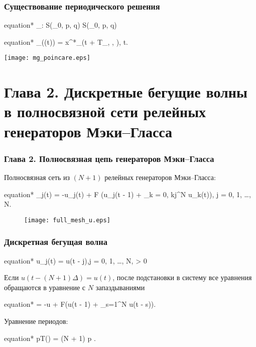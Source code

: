 \begin{frame}
	\frametitle{Существование периодического решения}
	
	\begin{empheq}[box=\myeq]{equation*}
		\Pi_{\gamma}: S(\sigma_0, p, q) \to S(\sigma_0, p, q)
	\end{empheq}
	\begin{empheq}[box=\myeq]{equation*}
		\Pi_{\gamma}(\varphi(t)) = x^*_{\gamma}(t + T_{\gamma, \varphi}, \varphi), \quad t.
	\end{empheq}
	
	\begin{center}
		\texttt{[image: mg\_poincare.eps]}
	\end{center}
\end{frame}

\section{Глава 2. Дискретные бегущие волны в полносвязной сети релейных генераторов Мэки--Гласса}


\begin{frame}
	\frametitle{Глава 2. Полносвязная цепь генераторов Мэки--Гласса}
	
	Полносвязная сеть из $(N + 1)$ релейных генераторов Мэки--Гласса:
	
	\begin{empheq}[box=\myeq]{equation*}
		_j(t) = -\beta u_j(t) + \alpha F \bigg(u_j(t - 1) + \sum\limits_{k = 0, k\neq j}^N u_k(t)\bigg), \quad j = 0, 1, \dots, N.
	\end{empheq}
	
	\begin{figure}
		\centering
		\texttt{[image: full\_mesh\_u.eps]}
	\end{figure}
\end{frame}


\begin{frame}
	\frametitle{Дискретная бегущая волна}
	
	\begin{empheq}[box=\myeq]{equation*}
		u_j(t) = u(t - j\Delta),\quad j = 0, 1, \ldots, N,  \Delta > 0 
	\end{empheq}
	
	Если $u\left(t - (N + 1)\Delta\right) = u(t)$, после подстановки в систему все уравнения обращаются в уравнение с $N$ запаздываниями
	
	\begin{empheq}[box=\myeq]{equation*}
		\label{eq:mg_aux1}
		 = -\beta u + \alpha F\left(u(t - 1) + \sum_{s=1}^{N} u(t - s\Delta)\right). 
	\end{empheq}
	
	Уравнение периодов:
	
	\begin{empheq}[box=\myeq]{equation*}
		pT(\Delta) = (N + 1)\Delta \quad {} p \in {}.
	\end{empheq}
	
	
\end{frame}

